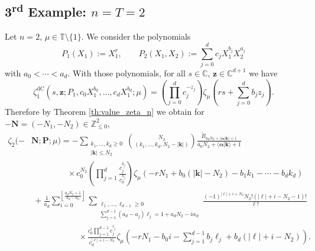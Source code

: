 \documentclass[a4paper,12pt]{article}
\theoremstyle{definition}
\numberwithin{equation}{section}
\newcommand{\dc}{\mathrm{dC}}
\begin{document}

\subsection{\texorpdfstring{3\textsuperscript{rd}}{Third} Example: \texorpdfstring{$n=T=2$}{n and T equal 2}}

Let $n=2$, $\mu \in \mathbb{T} \setminus \{ 1 \}$. We consider the polynomials 
$$ P_1(X_1):=X_1^r, \qquad P_2(X_1,X_2):=\sum_{j=0}^d c_{j} X_1^{b_j} X_2^{a_j} $$
with $a_0<\cdots <a_d$. With those polynomials, for all $s \in \mathbb{C}$, $\mathbf{z}\in \mathbb{C}^{d+1}$ we have
$$ \zeta_1^{\dc}(s,\mathbf{z};P_1,c_0X_1^{b_0},\ldots,c_dX_1^{b_d};\mu)= \left( \prod_{j=0}^d c_j^{-z_j} \right) \zeta_{\mu}(rs+\sum_{j=0}^d b_j z_j). $$
Therefore
by Theorem \ref{th:value_zeta_n} we obtain for $-\mathbf{N}=(-N_1,-N_2) \in \mathbb{Z}_{\leq 0}^2$,
\begin{align}
    \zeta_{2}(-&\mathbf{N};\mathbf{P};\mu)=-\sum_{\substack{k_1,\ldots,k_d \geq 0 \\ |\mathbf{k}| \leq N_2}} \binom{N_2}{(k_1,\ldots,k_d,N_2-|\mathbf{k}|)} \frac{\widetilde{B}_{a_0N_2+\langle \boldsymbol{\alpha}|\mathbf{k}\rangle+1}}{a_0N_2+\langle \boldsymbol{\alpha}|\mathbf{k} \rangle+1} \label{eq:values_special_case_transcendental} \\
    & \hspace{52pt} \times c_0^{N_2} \left( \prod_{j=1}^d \frac{c_j^{k_j}}{c_0^{k_j}} \right) \zeta_{\mu}\left(-rN_1+b_0(|\mathbf{k}|-N_2)-b_1k_1-\cdots-b_d k_d\right) \nonumber \\
    &\hspace{3pt}+ \frac{1}{a_d}\sum_{i=0}^{\left\lfloor \frac{a_dN_2+1}{a_d-a_0}\right\rfloor} \sum_{\substack{\ell_1,\ldots,\ell_{d-1} \geq 0 \\ \sum_{j=1}^{d-1} (a_d-a_j) \ell_j=1+a_dN_2-i\alpha_d}} \frac{(-1)^{|\boldsymbol{\ell}|+i+N_2}N_2!(|\boldsymbol{\ell}|+i-N_2-1)!}{\boldsymbol{\ell}!} \nonumber \\
    & \hspace{68pt} \times \frac{c_0^i \prod_{j=1}^{d-1} c_j^{\ell_j}}{c_d^{|\boldsymbol{\ell}|+i-N_2}} \zeta_{\mu}(-rN_1-b_0i-\sum_{j=1}^{d-1}b_j\ell_j+b_d(|\boldsymbol{\ell}|+i-N_2)). \nonumber
\end{align}
\end{document}
